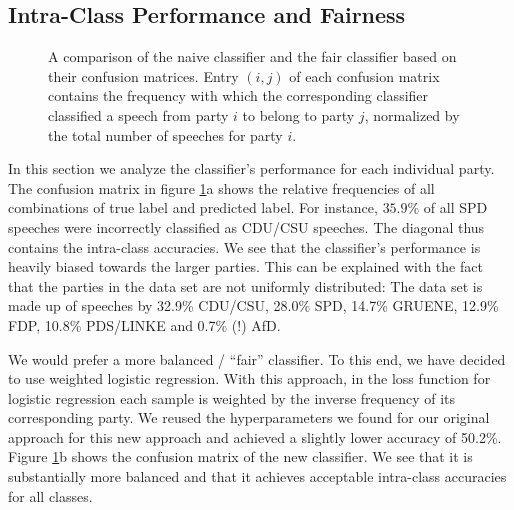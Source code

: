 \documentclass{article}
\begin{document}
\subsection{Intra-Class Performance and Fairness}
\begin{figure}
  \caption{A comparison of the naive classifier and the fair classifier based on their confusion matrices. Entry $(i, j)$ of each confusion matrix contains the frequency with which the corresponding classifier classified a speech from party $i$ to belong to party $j$, normalized by the total number of speeches for party $i$.}
  \label{fig:conf_mat_comp}
\end{figure}


In this section we analyze the classifier's performance for each individual party. The confusion matrix in figure \ref{fig:conf_mat_comp}a shows the relative frequencies of all combinations of true label and predicted label. For instance, $35.9\%$ of all SPD speeches were incorrectly classified as CDU/CSU speeches. The diagonal thus contains the intra-class accuracies. We see that the classifier's performance is heavily biased towards the larger parties. This can be explained with the fact that the parties in the data set are not uniformly distributed: The data set is made up of speeches by 32.9\% CDU/CSU, 28.0\% SPD, 14.7\% GRUENE, 12.9\% FDP, 10.8\% PDS/LINKE and 0.7\% (!) AfD.

We would prefer a more balanced / ``fair'' classifier. To this end, we have decided to use weighted logistic regression. With this approach, in the loss function for logistic regression each sample is weighted by the inverse frequency of its corresponding party. We reused the hyperparameters we found for our original approach for this new approach and achieved a slightly lower accuracy of 50.2\%. Figure \ref{fig:conf_mat_comp}b shows the confusion matrix of the new classifier. We see that it is substantially more balanced and that it achieves acceptable intra-class accuracies for all classes.
\end{document}
